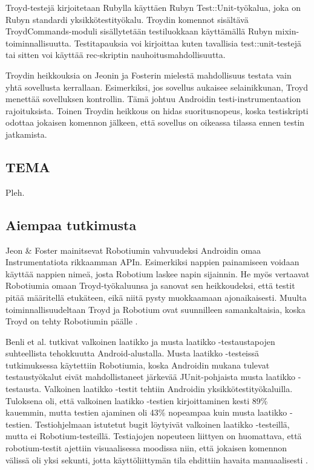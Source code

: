 Troyd-testejä kirjoitetaan Rubylla käyttäen Rubyn Test::Unit-työkalua, joka on Rubyn standardi yksikkötestityökalu. \cite{testunit} Troydin komennot sisältävä TroydCommands-moduli sisällytetään testiluokkaan käyttämällä Rubyn mixin-toiminnallisuutta. Testitapauksia voi kirjoittaa kuten tavallisia test::unit-testejä tai sitten voi käyttää rec-skriptin nauhoitusmahdollisuutta.

Troydin heikkouksia on Jeonin ja Fosterin mielestä mahdollisuus testata vain yhtä sovellusta kerrallaan. Esimerkiksi, jos sovellus aukaisee selainikkunan, Troyd menettää sovelluksen kontrollin. Tämä johtuu Androidin testi-instrumentaation rajoituksista. Toinen Troydin heikkous on hidas suoritusnopeus, koska testiskripti odottaa jokaisen komennon jälkeen, että sovellus on oikeassa tilassa ennen testin jatkamista. \cite{troyd}

\subsection{TEMA}

Pleh.

\subsection{Aiempaa tutkimusta}

Jeon \& Foster mainitsevat Robotiumin vahvuudeksi Androidin omaa Instrumentatiota rikkaamman APIn. Esimerkiksi nappien painamiseen voidaan käyttää nappien nimeä, josta Robotium laskee napin sijainnin. He myös vertaavat Robotiumia omaan Troyd-työkaluunsa ja sanovat sen heikkoudeksi, että testit pitää määritellä etukäteen, eikä niitä pysty muokkaamaan ajonaikaisesti. Muulta toiminnallisuudeltaan Troyd ja Robotium ovat suunnilleen samankaltaisia, koska Troyd on tehty Robotiumin päälle \cite{troyd}.

Benli et al. tutkivat valkoinen laatikko ja musta laatikko -testaustapojen suhteellista tehokkuutta Android-alustalla. Musta laatikko -testeissä tutkimuksessa käytettiin Robotiumia, koska Androidin mukana tulevat testaustyökalut eivät mahdollistaneet järkevää JUnit-pohjaista musta laatikko -testausta. Valkoinen laatikko -testit tehtiin Androidin yksikkötestityökaluilla. Tuloksena oli, että valkoinen laatikko -testien kirjoittaminen kesti 89\% kauemmin, mutta testien ajaminen oli 43\% nopeampaa kuin musta laatikko -testien. Testiohjelmaan istutetut bugit löytyivät valkoinen laatikko -testeillä, mutta ei Robotium-testeillä. Testiajojen nopeuteen liittyen on huomattava, että robotium-testit ajettiin visuaalisessa moodissa niin, että jokaisen komennon välissä oli yksi sekunti, jotta käyttöliittymän tila ehdittiin havaita manuaalisesti \cite{benli12}.

